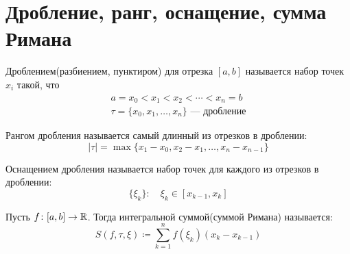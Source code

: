 \section{Дробление, ранг, оснащение, сумма Римана}
\begin{conj}
    Дроблением(разбиением, пунктиром) для отрезка $[a, b]$ называется набор точек $x_i$ такой, что
    \begin{equation*}
        \begin{gathered}
            a = x_0 < x_1 < x_2 < \dotsb < x_n = b\\
            \tau = \{x_0, x_1, \dotsc, x_n\}\text{ --- дробление}
        \end{gathered}
    \end{equation*}

    Рангом дробления называется самый длинный из отрезков в дроблении:
    \begin{equation*}
        |\tau| = \max\{x_1 - x_0, x_2 - x_1, \dotsc, x_n - x_{n - 1}\}
    \end{equation*}

    Оснащением дробления называется набор точек для каждого из отрезков в дроблении:
    \begin{equation*}
        \{\xi_k\}\colon \quad \xi_k \in [x_{k - 1}, x_k]
    \end{equation*}

    Пусть $f\colon [a, b] \to \mathbb{R}$. Тогда интегральной суммой(суммой Римана) называется:
    \begin{equation*}
        S(f, \tau, \xi) \coloneqq \sum\limits_{k = 1}^{n} f(\xi_k)(x_k - x_{k - 1})
    \end{equation*}
\end{conj}